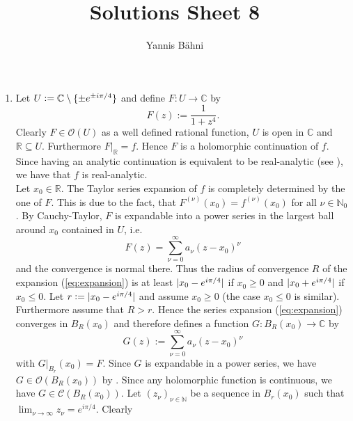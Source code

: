 

\title{Solutions Sheet 8}
\author{Yannis B\"{a}hni}
\address[Yannis B\"{a}hni]{University of Zurich, R\"{a}mistrasse 71, 8006 Zurich}


\maketitle
\thispagestyle{fancy}
\begin{enumerate}[label = \textbf{Exercise \arabic*.},wide = 0pt, itemsep=1.5ex]
	\item Let $U := \mathbb{C} \setminus \cbr[0]{\pm e^{\pm i\pi/4}}$ and define $F: U \to \mathbb{C}$ by
		\begin{equation}
			F(z) := \frac{1}{1 + z^4}.	
		\end{equation}
		Clearly $F \in \mathcal{O}(U)$ as a well defined rational function, $U$ is open in $\mathbb{C}$ and $\mathbb{R} \subseteq U$. Furthermore $F\vert_\mathbb{R} = f$. Hence $F$ is a holomorphic continuation of $f$. Since having an analytic continuation is equivalent to be real-analytic (see \cite[100]{fischer2003funktionentheorie}), we have that $f$ is real-analytic.\\
		Let $x_0 \in \mathbb{R}$. The Taylor series expansion of $f$ is completely determined by the one of $F$. This is due to the fact, that $F^{(\nu)}(x_0) = f^{(\nu)}(x_0)$ for all $\nu \in \mathbb{N}_0$. By Cauchy-Taylor, $F$ is expandable into a power series in the largest ball around $x_0$ contained in $U$, i.e. 
		\begin{equation}
			F(z) = \sum_{\nu = 0}^\infty a_\nu(z - x_0)^\nu
			\label{eq:expansion}
		\end{equation}
		\noindent and the convergence is normal there. Thus the radius of convergence $R$ of the expansion (\ref{eq:expansion}) is at least $\abs[0]{x_0 - e^{i\pi/4}}$ if $x_0 \geq 0$ and $\abs[0]{x_0 + e^{i\pi/4}}$ if $x_0 \leq 0$. Let $r:= \abs[0]{x_0 - e^{i\pi/4}}$ and assume $x_0 \geq 0$ (the case $x_0 \leq 0$ is similar). Furthermore assume that $R > r$. Hence the series expansion (\ref{eq:expansion}) converges in $B_R(x_0)$ and therefore defines a function $G: B_R(x_0) \to \mathbb{C}$ by
		\begin{equation}
			G(z) := \sum_{\nu = 0}^\infty a_\nu(z - x_0)^\nu 
		\end{equation}
		\noindent with $G\vert_{B_r}(x_0) = F$. Since $G$ is expandable in a power series, we have $G \in \mathcal{O}(B_R(x_0))$ by \cite[187]{remmert2002funktionentheorie}. Since any holomorphic function is continuous, we have $G \in \mathscr{C}(B_R(x_0))$. Let $(z_\nu)_{\nu \in \mathbb{N}}$ be a sequence in $B_r(x_0)$ such that $\lim_{\nu \to \infty} z_\nu = e^{i\pi/4}$. Clearly

\end{enumerate}
